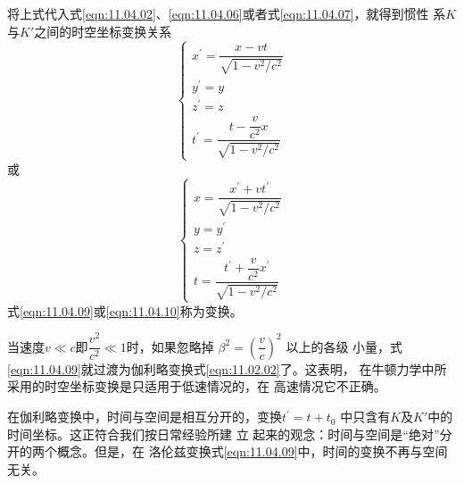 \documentclass[../outline-of-mechanics.tex]{subfiles}
\begin{document}
将上式代入式\eqref{eqn:11.04.02}、\eqref{eqn:11.04.06}或者式\eqref{eqn:11.04.07}，就得到惯性
系$ K $与$ K' $之间的时空坐标变换关系
\begin{equation}\label{eqn:11.04.09}
  \begin{cases}
    x ^ { \prime } = \dfrac { x - v t } { \sqrt { 1 - v ^ 2 / c ^ 2 } } \\
    y ^ { \prime } = y                                                  \\
    z ^ { \prime } = z                                                  \\
    t ^ { \prime } = \dfrac { t - \dfrac v { c ^ 2 } x } { \sqrt { 1 - v ^ 2 / c ^ 2 } }
  \end{cases}
\end{equation}
或
\begin{equation}\label{eqn:11.04.10}
  \begin{cases}
    x = \dfrac { x ^ { \prime } + v t ^ { \prime } } { \sqrt { 1 - v ^ 2 / c ^ 2 } } \\
    y = y ^ { \prime }                                                               \\
    z = z ^ { \prime }                                                               \\
    t = \dfrac { t ^ { \prime } + \dfrac v { c ^ 2 } x ^ { \prime } } { \sqrt { 1 - v ^ 2 / c ^ 2 } }
  \end{cases}
\end{equation}
式\eqref{eqn:11.04.09}或\eqref{eqn:11.04.10}称为变换。

当速度$ v \ll c $即$ \dfrac { v ^ { 2 } } { c ^ { 2 } } \ll 1 $时，如果忽略掉
$ \beta ^ { 2 } = \left( \dfrac { v } { c } \right) ^ { 2 } $
以上的各级
小量，式\eqref{eqn:11.04.09}就过渡为伽利略变换\lhbrak 式\eqref{eqn:11.02.02}\rhbrak 了。这表明，
在牛顿力学中所采用的时空坐标变换是只适用于低速情况的，在
高速情况它不正确。

在伽利略变换中，时间与空间是相互分开的，变换$ t ^ { \prime } = t + t _ { 0 } $
中只含有$ K $及$ K ' $中的时间坐标。这正符合我们按日常经验所建
立
起来的观念：时间与空间是“绝对”分开的两个概念。但是，在
洛伦兹变换\lhbrak 式\eqref{eqn:11.04.09}\rhbrak 中，时间的变换不再与空间无关。
\end{document}

